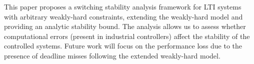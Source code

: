 This paper proposes a switching stability analysis framework for LTI systems with arbitrary weakly-hard constraints, extending the weakly-hard model and providing an analytic stability bound.
The analysis allows us to assess whether computational errors (present in industrial controllers) affect the stability of the controlled systems.
Future work will focus on the performance loss due to the presence of deadline misses following the extended weakly-hard model.
